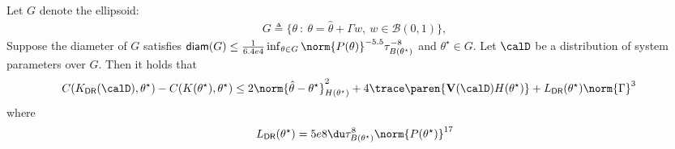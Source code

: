 \begin{lemma}
    \label{lem: DR suboptimality upper bound}
    Let $G$ denote the ellipsoid:
    \begin{align*}
        G \triangleq \{\theta ~:~ \theta=\hat \theta + \Gamma w, ~ w\in\mathcal{B}(0, 1)\},
    \end{align*} 
    Suppose the diameter of $G$ satisfies $\mathsf{diam}(G)\leq\frac{1}{6.4e4}\inf_{\theta\in G}\norm{P(\theta)}^{-5.5} \tau_{B(\theta^\star)}^{-8}$ and $\theta^\star\in G$. 
    Let $\calD$ be a distribution of system parameters over $G$.  Then it holds that
     \begin{align*}
        &C(K_{\mathsf{DR}}(\calD), \theta^\star) - C(K(\theta^\star), \theta^\star) \leq 2\norm{\hat\theta-\theta^\star}^2_{H(\theta^\star)} + 4\trace\paren{\mathbf{V}(\calD) H(\theta^\star)}+ L_{\mathsf{DR}}(\theta^\star)\norm{\Gamma}^3
    \end{align*}
    where
    \begin{align*}
        L_{\mathsf{DR}}(\theta^\star) = 5e8\du\tau_{B(\theta^\star)}^8\norm{P(\theta^\star)}^{17}
    \end{align*}
\end{lemma}

